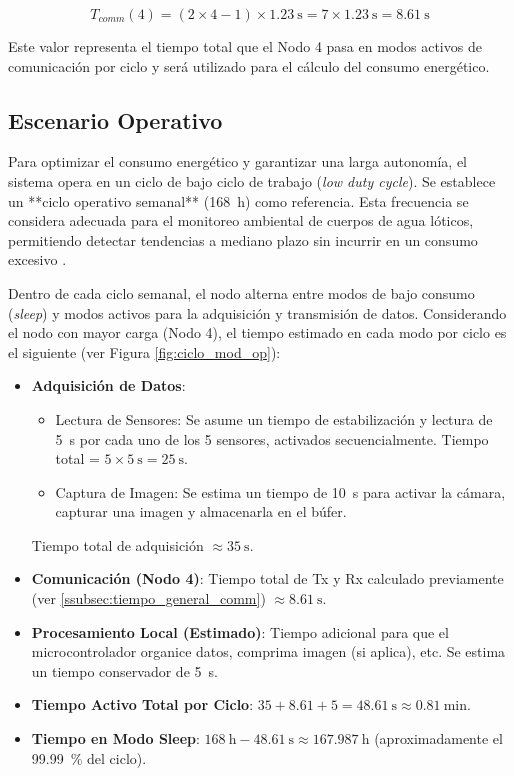 \[
T_{comm}(4) = (2 \times 4 - 1) \times \SI{1.23}{\second} = 7 \times \SI{1.23}{\second} = \boxed{\SI{8.61}{\second}}
\]

Este valor representa el tiempo total que el Nodo 4 pasa en modos activos de comunicación por ciclo y será utilizado para el cálculo del consumo energético.


\subsection{Escenario Operativo}
\label{subsec:escenario_operativo}

Para optimizar el consumo energético y garantizar una larga autonomía, el sistema opera en un ciclo de bajo ciclo de trabajo (\textit{low duty cycle}). Se establece un **ciclo operativo semanal** (\SI{168}{\hour}) como referencia. Esta frecuencia se considera adecuada para el monitoreo ambiental de cuerpos de agua lóticos, permitiendo detectar tendencias a mediano plazo sin incurrir en un consumo excesivo \cite{nom001}.

Dentro de cada ciclo semanal, el nodo alterna entre modos de bajo consumo (\textit{sleep}) y modos activos para la adquisición y transmisión de datos. Considerando el nodo con mayor carga (Nodo 4), el tiempo estimado en cada modo por ciclo es el siguiente (ver Figura \ref{fig:ciclo_mod_op}):

\begin{itemize}
    \item \textbf{Adquisición de Datos}:
        \begin{itemize}
            \item Lectura de Sensores: Se asume un tiempo de estabilización y lectura de \SI{5}{\second} por cada uno de los 5 sensores, activados secuencialmente. Tiempo total = $5 \times \SI{5}{\second} = \SI{25}{\second}$.
            \item Captura de Imagen: Se estima un tiempo de \SI{10}{\second} para activar la cámara, capturar una imagen y almacenarla en el búfer. %
        \end{itemize}
        Tiempo total de adquisición $\approx \SI{35}{\second}$.
    \item \textbf{Comunicación (Nodo 4)}: Tiempo total de Tx y Rx calculado previamente (ver \ref{ssubsec:tiempo_general_comm}) $\approx \SI{8.61}{\second}$.
    \item \textbf{Procesamiento Local (Estimado)}: Tiempo adicional para que el microcontrolador organice datos, comprima imagen (si aplica), etc. Se estima un tiempo conservador de \SI{5}{\second}. %
    \item \textbf{Tiempo Activo Total por Ciclo}: $35 + 8.61 + 5 = \SI{48.61}{\second} \approx \SI{0.81}{\minute}$.
    \item \textbf{Tiempo en Modo Sleep}: $\SI{168}{\hour} - \SI{48.61}{\second} \approx \SI{167.987}{\hour}$ (aproximadamente el \SI{99.99}{\percent} del ciclo).
\end{itemize}

